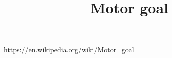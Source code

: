 \documentclass[a4paper]{article}
\title{Motor goal}
\date{}
\begin{document}
    \maketitle

    \url{https://en.wikipedia.org/wiki/Motor_goal}
\end{document}
